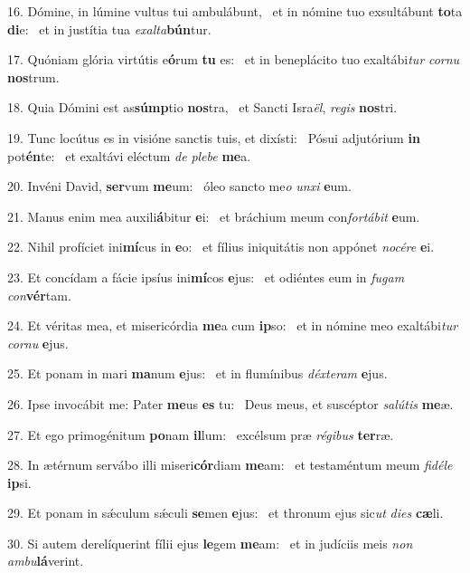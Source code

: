 16. Dómine, in lúmine vultus tui ambulábunt, \dag\  et in nómine tuo exsultábunt \textbf{to}ta \textbf{di}e: \ast\  et in justítia tua \textit{ex}\textit{al}\textit{ta}\textbf{bún}tur.\

17. Quóniam glória virtútis e\textbf{ó}rum \textbf{tu} es: \ast\  et in beneplácito tuo exaltábi\textit{tur} \textit{cor}\textit{nu} \textbf{nos}trum.\

18. Quia Dómini est as\textbf{súmp}tio \textbf{nos}tra, \ast\  et Sancti Isra\textit{ël}, \textit{re}\textit{gis} \textbf{nos}tri.\

19. Tunc locútus es in visióne sanctis tuis, et dixísti: \dag\  Pósui adjutórium \textbf{in} pot\textbf{én}te: \ast\  et exaltávi eléctum \textit{de} \textit{ple}\textit{be} \textbf{me}a.\

20. Invéni David, \textbf{ser}vum \textbf{me}um: \ast\  óleo sancto me\textit{o} \textit{un}\textit{xi} \textbf{e}um.\

21. Manus enim mea auxili\textbf{á}bitur \textbf{e}i: \ast\  et bráchium meum con\textit{for}\textit{tá}\textit{bit} \textbf{e}um.\

22. Nihil profíciet ini\textbf{mí}cus in \textbf{e}o: \ast\  et fílius iniquitátis non appónet \textit{no}\textit{cé}\textit{re} \textbf{e}i.\

23. Et concídam a fácie ipsíus ini\textbf{mí}cos \textbf{e}jus: \ast\  et odiéntes eum in \textit{fu}\textit{gam} \textit{con}\textbf{vér}tam.\

24. Et véritas mea, et misericórdia \textbf{me}a cum \textbf{ip}so: \ast\  et in nómine meo exaltábi\textit{tur} \textit{cor}\textit{nu} \textbf{e}jus.\

25. Et ponam in mari \textbf{ma}num \textbf{e}jus: \ast\  et in flumínibus \textit{déx}\textit{te}\textit{ram} \textbf{e}jus.\

26. Ipse invocábit me: Pater \textbf{me}us \textbf{es} tu: \ast\  Deus meus, et suscéptor \textit{sa}\textit{lú}\textit{tis} \textbf{me}æ.\

27. Et ego primogénitum \textbf{po}nam \textbf{il}lum: \ast\  excélsum præ \textit{ré}\textit{gi}\textit{bus} \textbf{ter}ræ.\

28. In ætérnum servábo illi miseri\textbf{cór}diam \textbf{me}am: \ast\  et testaméntum meum \textit{fi}\textit{dé}\textit{le} \textbf{ip}si.\

29. Et ponam in sǽculum sǽculi \textbf{se}men \textbf{e}jus: \ast\  et thronum ejus sic\textit{ut} \textit{di}\textit{es} \textbf{cæ}li.\

30. Si autem derelíquerint fílii ejus \textbf{le}gem \textbf{me}am: \ast\  et in judíciis meis \textit{non} \textit{am}\textit{bu}\textbf{lá}verint.\

